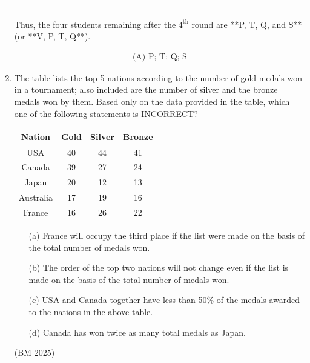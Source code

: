 \begin{enumerate}[label=\thesubsection.\arabic*, ref=\thesubsection.\theenumi]
---

Thus, the four students remaining after the $4^{\text{th}}$ round are **P, T, Q, and S** (or **V, P, T, Q**).

\begin{align}
\text{(A) P; T; Q; S}
\end{align}
\noindent{}


\item The table lists the top 5 nations according to the number of gold medals won in a tournament; also included are the number of silver and the bronze medals won by them. Based only on the data provided in the table, which one of the following statements is INCORRECT?

\begin{center}
\begin{tabular}{|c|c|c|c|}
\hline
\textbf{Nation} & \textbf{Gold} & \textbf{Silver} & \textbf{Bronze} \\ \hline
USA & 40 & 44 & 41 \\ \hline
Canada & 39 & 27 & 24 \\ \hline
Japan & 20 & 12 & 13 \\ \hline
Australia & 17 & 19 & 16 \\ \hline
France & 16 & 26 & 22 \\ \hline
\end{tabular}
\end{center}

\begin{multicols}{2}
\begin{enumerate}
\setlength{\itemsep}{0pt}
    \item[(a)] France will occupy the third place if the list were made on the basis of the total number of medals won.
    \item[(b)] The order of the top two nations will not change even if the list is made on the basis of the total number of medals won.
    \item[(c)] USA and Canada together have less than 50\% of the medals awarded to the nations in the above table.
    \item[(d)] Canada has won twice as many total medals as Japan.
\end{enumerate}
\end{multicols}

\hfill  (BM 2025)




\end{enumerate}
